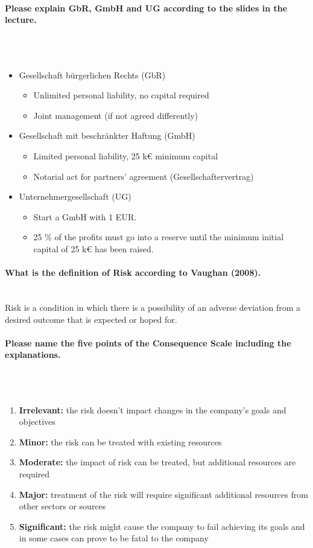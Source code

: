\documentclass[10pt,a4paper,noendnumber=true]{scrartcl}
\newcommand{\properparagraph}[1]{\paragraph{\textcolor{Emerald}{#1}}\mbox{}\\}
\begin{document}
\properparagraph{Please explain GbR, GmbH and UG according to the slides in the lecture.}
\\[-6ex]
\begin{itemize}
	\item Gesellschaft bürgerlichen Rechts (GbR)
	\begin{itemize}
		\item Unlimited personal liability, no capital required
		\item Joint management (if not agreed differently)
	\end{itemize}
	\item Gesellschaft mit beschränkter Haftung	(GmbH)
	\begin{itemize}
		\item Limited personal liability, 25 k€ minimum capital
		\item Notarial act for partners’ agreement (Gesellschaftervertrag)
	\end{itemize}
	\item Unternehmergesellschaft (UG)
	\begin{itemize}
		\item Start a  GmbH with 1 EUR.
		\item 25 \% of the profits must go into a reserve until the	minimum initial capital of 25 k€ has been raised.
	\end{itemize}
\end{itemize}

\properparagraph{What is the definition of Risk according to Vaughan (2008).}
Risk is a condition in which there is a possibility of an adverse deviation from a desired outcome that is expected or hoped for.

\properparagraph{Please name the five points of the Consequence Scale including the explanations.}
\\[-6ex]
\begin{enumerate}
	\item  \textbf{Irrelevant:} the risk doesn’t impact changes in the company’s goals
	and objectives
	\item  \textbf{Minor:} the risk can be treated with existing resources
	\item  \textbf{Moderate:} the impact of risk can be treated, but additional resources
	are required
	\item  \textbf{Major:} treatment of the risk will require significant additional
	resources from other sectors or sources
	\item  \textbf{Significant:} the risk might cause the company to fail achieving its
	goals and in some cases can prove to be fatal to the company
\end{enumerate}
\end{document}

